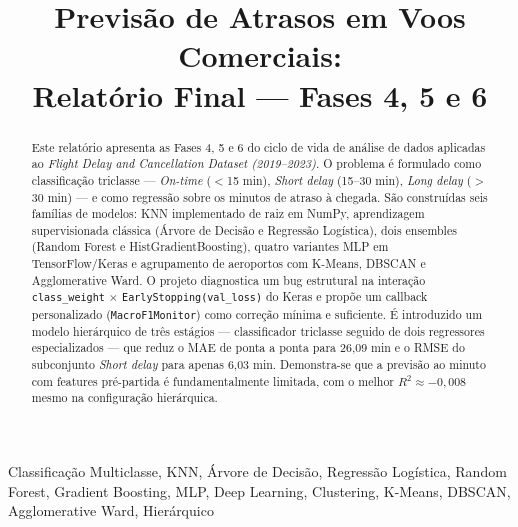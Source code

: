 \documentclass[conference]{IEEEtran}
\begin{document}
\title{Previsão de Atrasos em Voos Comerciais:\\Relatório Final — Fases 4, 5 e 6}

\author{
\and
{}
}

\maketitle

\begin{abstract}
Este relatório apresenta as Fases 4, 5 e 6 do ciclo de vida de análise de dados
aplicadas ao \textit{Flight Delay and Cancellation Dataset (2019–2023)}. O problema é
formulado como classificação triclasse — \textit{On-time} ($<$15 min), \textit{Short
delay} (15–30 min), \textit{Long delay} ($>$30 min) — e como regressão sobre os
minutos de atraso à chegada. São construídas seis famílias de modelos: KNN
implementado de raiz em NumPy, aprendizagem supervisionada clássica (Árvore de
Decisão e Regressão Logística), dois ensembles (Random Forest e HistGradientBoosting),
quatro variantes MLP em TensorFlow/Keras e agrupamento de aeroportos com K-Means,
DBSCAN e Agglomerative Ward. O projeto diagnostica um bug estrutural na interação
\texttt{class\_weight} $\times$ \texttt{EarlyStopping(val\_loss)} do Keras e propõe um
callback personalizado (\texttt{MacroF1Monitor}) como correção mínima e suficiente.
É introduzido um modelo hierárquico de três estágios — classificador triclasse seguido
de dois regressores especializados — que reduz o MAE de ponta a ponta para 26,09 min
e o RMSE do subconjunto \textit{Short delay} para apenas 6,03 min. Demonstra-se que
a previsão ao minuto com features pré-partida é fundamentalmente limitada, com o
melhor $R^2 \approx -0{,}008$ mesmo na configuração hierárquica.
\end{abstract}

\begin{IEEEkeywords}
Classificação Multiclasse, KNN, Árvore de Decisão, Regressão Logística,
Random Forest, Gradient Boosting, MLP, Deep Learning, Clustering,
K-Means, DBSCAN, Agglomerative Ward, Hierárquico
\end{IEEEkeywords}
\end{document}
